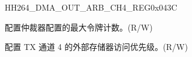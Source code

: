 \begin{register}{H}{H264\_DMA\_OUT\_ARB\_CH4\_REG}{0x043C}\label{regdesc:H264DMAOUTARBCH4REG}
%
%
%
\regnewline%
\begin{regdesc}\begin{reglist}
\label{fielddesc:H264DMAOUTARBTOKENNUMCH4}\item [H264\_DMA\_OUT\_ARB\_TOKEN\_NUM\_CH4] 配置仲裁器配置的最大令牌计数。(R/W)
\label{fielddesc:H264DMAEXTEROUTARBPRIORITYCH4}\item [H264\_DMA\_EXTER\_OUT\_ARB\_PRIORITY\_CH4] 配置 TX 通道 4 的外部存储器访问优先级。(R/W)
\end{reglist}\end{regdesc}
\end{register}


